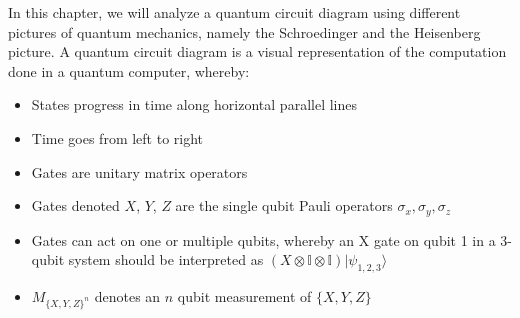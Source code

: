 In this chapter, we will analyze a quantum circuit diagram using different
pictures of quantum mechanics, namely the Schroedinger and the Heisenberg picture.
A quantum circuit diagram is a visual representation of the computation done
in a quantum computer, whereby:
\begin{itemize}
	\item States progress in time along horizontal parallel lines
	\item Time goes from left to right
	\item Gates are unitary matrix operators
	\item Gates denoted $X$, $Y$, $Z$ are the single qubit Pauli operators
		$\sigma_x,\sigma_y,\sigma_z$
	\item Gates can act on one or multiple qubits, whereby an X gate 
		on qubit 1 in a 3-qubit system should be interpreted as
		$(X\otimes \mathbb{I} \otimes \mathbb{I}) |\psi_{1,2,3}\rangle$
    \item $M_{\{X,Y,Z\}^n}$ denotes an $n$ qubit measurement of $\{X,Y,Z\}$ 
\end{itemize}




\newpage
